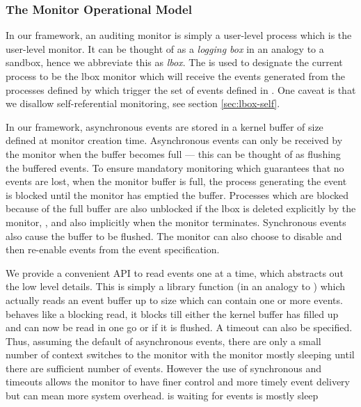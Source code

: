 \subsubsection{The Monitor Operational Model}

In our framework, an auditing monitor is simply a user-level process
which is the user-level monitor.
It can be thought of as a {\em logging box} in an analogy to
a sandbox, hence we abbreviate this as {\em lbox}.
The  is used to designate
the current process to be the lbox monitor which will
receive the events generated from the processes defined by 
which trigger the set of events defined in .
One caveat is that we disallow self-referential monitoring, see
section \ref{sec:lbox-self}.

In our framework, asynchronous events are stored in a kernel buffer
of size  defined at monitor creation time. Asynchronous events
can only be received by the monitor when the buffer becomes full --- this
can be thought of as flushing the buffered events.
To ensure mandatory monitoring which guarantees that no events are lost, 
when the monitor buffer is full, the process generating the event 
is blocked until the monitor has emptied the buffer.
Processes which are blocked because of the full buffer are also unblocked
if the lbox is deleted explicitly by the monitor, ,
and also implicitly when the monitor terminates.
Synchronous events also cause the buffer to be flushed.
The monitor can also choose to disable and then re-enable events from
the event specification. 

We provide a convenient API to read events one at a time,
 which abstracts out the low level details.
This is simply a library function (in an analogy to ) which
actually reads an event buffer up to size  which can
contain one or more events. 
 behaves like a blocking read, it blocks
till either the kernel buffer has filled up and can now be read
in one go or if it is flushed. A timeout can also be specified.
Thus, assuming the default of asynchronous events, there are only a small
number of context switches to the monitor with the monitor mostly sleeping
until there are sufficient number of events. However the use of synchronous
and timeouts allows the monitor to have finer control and more timely
event delivery but can mean more system overhead.
is waiting for events is mostly sleep

